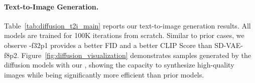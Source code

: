 \vspace{-10pt}
\paragraph{Text-to-Image Generation.} Table~\ref{tab:diffusion_t2i_main} reports our text-to-image generation results. All models are trained for 100K iterations from scratch. Similar to prior cases, we observe \modelshort-f32p1 provides a better FID and a better CLIP Score than SD-VAE-f8p2. Figure~\ref{fig:diffusion_visualization} demonstrates samples generated by the diffusion models with our \modelshort, showing the capacity to synthesize high-quality images while being significantly more efficient than prior models.